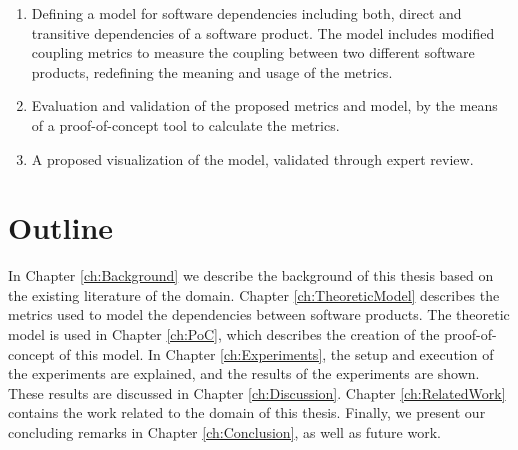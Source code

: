 \begin{enumerate}
	\item Defining a model for software dependencies including both, direct and transitive dependencies of a software product. The model includes modified coupling metrics to measure the coupling between two different software products, redefining the meaning and usage of the metrics.
  \blankls

	\item Evaluation and validation of the proposed metrics and model, by the means of a proof-of-concept tool to calculate the metrics.

  \item A proposed visualization of the model, validated through expert review.
\end{enumerate}

\section{Outline}
In Chapter \ref{ch:Background} we describe the background of this thesis based on the existing literature of the domain.
Chapter \ref{ch:TheoreticModel} describes the metrics used to model the dependencies between software products.
The theoretic model is used in Chapter \ref{ch:PoC}, which describes the creation of the proof-of-concept of this model.
In Chapter \ref{ch:Experiments}, the setup and execution of the experiments are explained, and the results of the experiments are shown. These results are discussed in Chapter \ref{ch:Discussion}. Chapter \ref{ch:RelatedWork} contains the work related to the domain of this thesis.
Finally, we present our concluding remarks in Chapter \ref{ch:Conclusion}, as well as future work.
